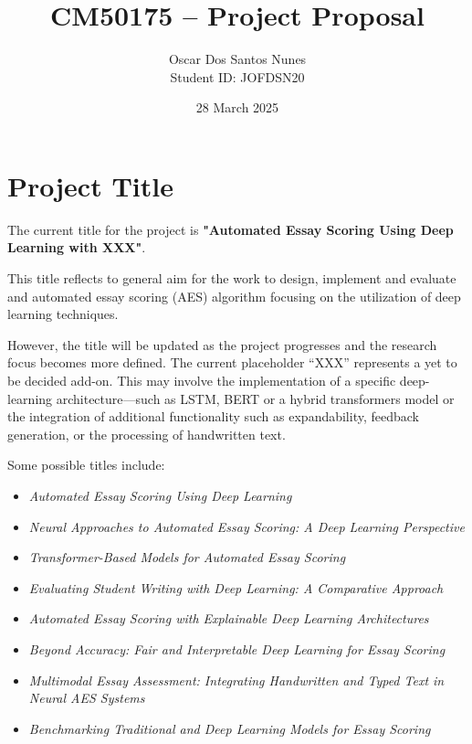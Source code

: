 \documentclass[11pt]{article}
\title{CM50175 – Project Proposal}
\author{Oscar Dos Santos Nunes \\ Student ID: JOFDSN20}
\date{28 March 2025}
\begin{document}
\maketitle

\section*{Project Title}
The current title for the project is \textbf{"Automated Essay Scoring Using Deep Learning with XXX"}.

This title reflects to general aim for the work to design, implement and evaluate and automated essay scoring (AES) 
algorithm focusing on the utilization of deep learning techniques.

However, the title will be updated as the project progresses and the research focus becomes more defined. 
The current placeholder “XXX” represents a yet to be decided add-on. 
This may involve the implementation of a specific deep-learning architecture—such as LSTM, 
BERT or a hybrid transformers model or the integration of additional functionality such as expandability, 
feedback generation, or the processing of handwritten text.

\vspace{0.5em}

Some possible titles include:
\begin{itemize}
    \item \textit{Automated Essay Scoring Using Deep Learning}
    \item \textit{Neural Approaches to Automated Essay Scoring: A Deep Learning Perspective}
    \item \textit{Transformer-Based Models for Automated Essay Scoring}
    \item \textit{Evaluating Student Writing with Deep Learning: A Comparative Approach}
    \item \textit{Automated Essay Scoring with Explainable Deep Learning Architectures}
    \item \textit{Beyond Accuracy: Fair and Interpretable Deep Learning for Essay Scoring}
    \item \textit{Multimodal Essay Assessment: Integrating Handwritten and Typed Text in Neural AES Systems}
    \item \textit{Benchmarking Traditional and Deep Learning Models for Essay Scoring}
\end{itemize}
\end{document}
